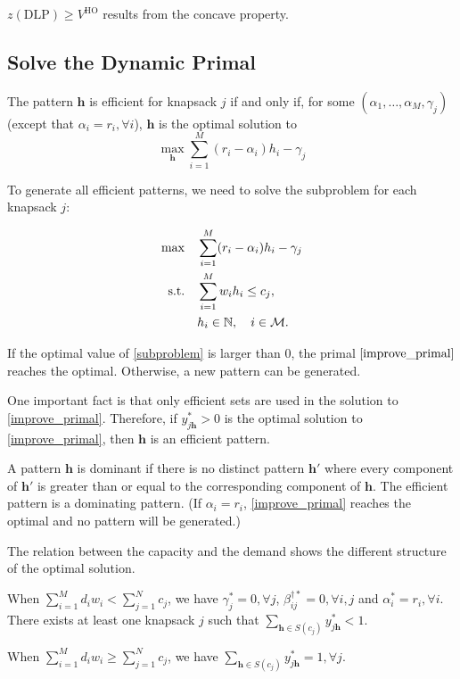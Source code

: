 \begin{lem}\label{concave}
$z(\text{DLP}) \geq V^{\text{HO}}$ results from the concave property. 
\end{lem}


\subsection{Solve the Dynamic Primal}

The pattern $\bm{h}$ is efficient for knapsack $j$ if and only if, for some $(\alpha_{1}, \ldots, \alpha_{M}, \gamma_{j})$ (except that $\alpha_{i} = r_i, \forall i$), $\bm{h}$ is the optimal solution to $$\max_{\bm{h}} \sum_{i=1}^{M} (r_i - \alpha_{i}) h_{i} - \gamma_{j}$$

To generate all efficient patterns, we need to solve the subproblem for each knapsack $j$:

\begin{align}\label{subproblem}
    \max \quad & \sum_{i=1}^{M} (r_i - \alpha_{i}) h_{i} - \gamma_{j} \\
    \text {s.t.} \quad & \sum_{i= 1}^{M} w_{i} h_{i} \leq c_j, \notag \\
    & h_{i} \in \mathbb{N}, \quad i \in \mathcal{M}. \notag
\end{align} 

If the optimal value of \eqref{subproblem} is larger than $0$, the primal $\eqref{improve_primal}$ reaches the optimal. Otherwise, a new pattern can be generated.

One important fact is that only efficient sets are used in the solution to \eqref{improve_primal}. Therefore, if $y_{j \bm{h}}^{*} > 0$ is the optimal solution to \eqref{improve_primal}, then $\bm{h}$ is an efficient pattern.


A pattern $\bm{h}$ is dominant if there is no distinct pattern $\bm{h}{'}$ where every component of $\bm{h}{'}$ is greater than or equal to the corresponding component of $\bm{h}$. The efficient pattern is a dominating pattern. (If $\alpha_{i} = r_i$, \eqref{improve_primal} reaches the optimal and no pattern will be generated.)

The relation between the capacity and the demand shows the different structure of the optimal solution.

\begin{lem}
When $\sum_{i=1}^{M} d_{i} w_{i} < \sum_{j=1}^{N} c_{j}$, we have $\gamma_{j}^{*} =0, \forall j$, $\beta_{ij}^{\dag *} =0, \forall i,j$ and $\alpha^{*}_{i} = r_i, \forall i$. There exists at least one knapsack $j$ such that $\sum_{\bm{h} \in S(c_{j})} y_{j \bm{h}}^{*} < 1$.

When $\sum_{i=1}^{M} d_{i} w_{i} \geq \sum_{j=1}^{N} c_{j}$, we have $\sum_{\bm{h} \in S(c_{j})} y_{j \bm{h}}^{*} = 1, \forall j$.
\end{lem}


